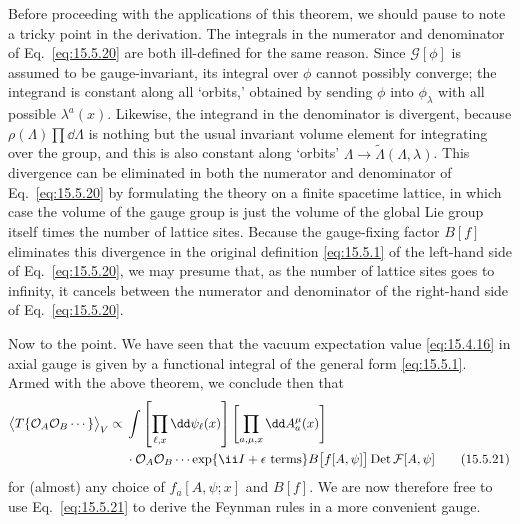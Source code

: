 Before proceeding with the applications of this theorem, we should pause to
note a tricky point in the derivation. The integrals in the numerator and
denominator of Eq.~\eqref{eq:15.5.20} are both ill-defined for the same reason.
Since $\mathcal G[\phi]$ is assumed to be gauge-invariant, its integral over
$\phi$ cannot possibly converge; the integrand is constant along all `orbits,'
obtained by sending $\phi$ into $\phi_\lambda$ with all possible
$\lambda^a(x)$. Likewise, the integrand in the denominator is divergent,
because $\rho(\Lambda)\prod \dd\Lambda$ is nothing but the usual invariant
volume element for integrating over the group, and this is also constant along
`orbits' $\Lambda\longrightarrow\widetilde\Lambda(\Lambda,\lambda)$. This
divergence can be eliminated in both the numerator and denominator of
Eq.~\eqref{eq:15.5.20} by formulating the theory on a finite spacetime lattice,
in which case the volume of the gauge group is just the volume of the global
Lie group itself times the number of lattice sites. Because the gauge-fixing
factor $B[f]$ eliminates this divergence in the original definition
\eqref{eq:15.5.1} of the left-hand side of Eq.~\eqref{eq:15.5.20}, we may
presume that, as the number of lattice sites goes to infinity, it cancels
between the numerator and denominator of the right-hand side of
Eq.~\eqref{eq:15.5.20}.

Now to the point. We have seen that the vacuum expectation value
\eqref{eq:15.4.16} in axial gauge is given by a functional integral of the
general form \eqref{eq:15.5.1}. Armed with the above theorem, we conclude then
that
\begin{align}
  \bigl\langle T\{\mathcal O_A\mathcal O_B\cdots\}\bigr\rangle_V
  \propto{}&\int\left[\prod_{\ell,x}\dd\psi_\ell(x)\right]
  \left[\prod_{a,\mu,x}\dd A_a^\mu(x)\right]
  \notag\\
  &\cdot\mathcal O_A\mathcal O_B\cdots\exp\{\ii I+\epsilon\text{ terms}\}
  B\bigl[f[A,\psi]\bigr]\operatorname{Det}\mathcal F[A,\psi]
  \tag{15.5.21}\label{eq:15.5.21}
\end{align}
for (almost) any choice of $f_a[A,\psi;x]$ and $B[f]$. We are now
therefore free to use Eq.~\eqref{eq:15.5.21} to derive the Feynman rules in a
more convenient gauge.

